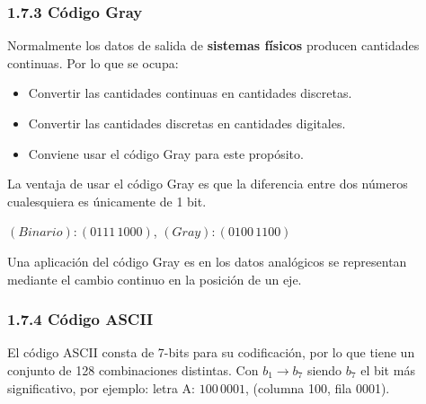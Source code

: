 \subsubsection*{1.7.3 C\'{o}digo Gray} Normalmente los datos de salida de
\textbf{sistemas f\'{i}sicos} producen cantidades continuas. Por lo que se ocupa:
\begin{itemize}
    \small
    \item Convertir las cantidades continuas en cantidades discretas.
    \item Convertir las cantidades discretas en cantidades digitales.
    \item Conviene usar el c\'{o}digo Gray para este prop\'{o}sito.
\end{itemize}
\medbreak

\begin{center}
\end{center}
\medskip
\normalsize

La ventaja de usar el c\'{o}digo Gray es que la diferencia entre dos
n\'{u}meros cualesquiera es \'{u}nicamente de 1 bit.
\begin{center}
    $(Binario): (0111\,1000)$, $(Gray): (0100\,1100)$
\end{center}

Una aplicaci\'{o}n del c\'{o}digo Gray es en los datos anal\'{o}gicos se
representan mediante el cambio continuo en la posici\'{o}n de un eje.

\subsubsection*{1.7.4 C\'{o}digo ASCII} El c\'{o}digo ASCII consta de 7-bits
para su codificaci\'{o}n, por lo que tiene un conjunto de 128 combinaciones
distintas. Con $b_1 \rightarrow b_7$ siendo $b_7$ el bit m\'{a}s significativo,
por ejemplo: letra A: $100\,0001$, (columna 100, fila 0001).

